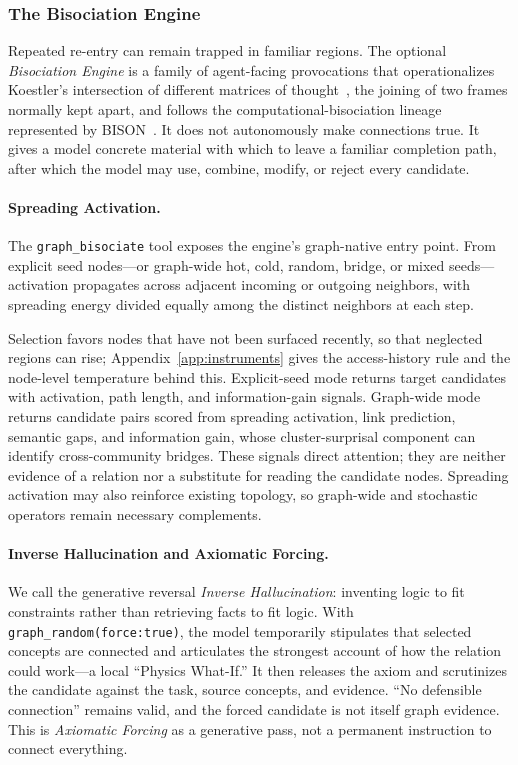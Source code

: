 \subsubsection{The Bisociation Engine}
\label{sec:bisociation}

Repeated re-entry can remain trapped in familiar regions. The optional \emph{Bisociation Engine} is a family of agent-facing provocations that operationalizes Koestler's intersection of different matrices of thought~\cite{koestler1964act}, the joining of two frames normally kept apart, and follows the computational-bisociation lineage represented by BISON~\cite{berthold2012bisociation}. It does not autonomously make connections true. It gives a model concrete material with which to leave a familiar completion path, after which the model may use, combine, modify, or reject every candidate.

\paragraph{Spreading Activation.}
The \texttt{graph\_bisociate} tool exposes the engine's graph-native entry point. From explicit seed nodes---or graph-wide hot, cold, random, bridge, or mixed seeds---activation propagates across adjacent incoming or outgoing neighbors, with spreading energy divided equally among the distinct neighbors at each step.

Selection favors nodes that have not been surfaced recently, so that neglected regions can rise; Appendix~\ref{app:instruments} gives the access-history rule and the node-level temperature behind this. Explicit-seed mode returns target candidates with activation, path length, and information-gain signals. Graph-wide mode returns candidate pairs scored from spreading activation, link prediction, semantic gaps, and information gain, whose cluster-surprisal component can identify cross-community bridges. These signals direct attention; they are neither evidence of a relation nor a substitute for reading the candidate nodes. Spreading activation may also reinforce existing topology, so graph-wide and stochastic operators remain necessary complements.

\paragraph{Inverse Hallucination and Axiomatic Forcing.}
We call the generative reversal \emph{Inverse Hallucination}: inventing logic to fit constraints rather than retrieving facts to fit logic. With \texttt{graph\_random(force:true)}, the model temporarily stipulates that selected concepts are connected and articulates the strongest account of how the relation could work---a local ``Physics What-If.'' It then releases the axiom and scrutinizes the candidate against the task, source concepts, and evidence. ``No defensible connection'' remains valid, and the forced candidate is not itself graph evidence. This is \emph{Axiomatic Forcing} as a generative pass, not a permanent instruction to connect everything.

